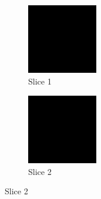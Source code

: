 \documentclass{article}
\begin{document}
\begin{figure}[t!] %
\begin{subfigure}{0.45\textwidth}
\includegraphics[width=\linewidth]{s_01.png}
\caption{Slice 1} \label{fig:a}
\end{subfigure}\hspace*{\fill}
\begin{subfigure}{0.45\textwidth}
\includegraphics[width=\linewidth]{s_02.png}
\caption{Slice 2} \label{fig:b}
\end{subfigure}


\end{figure}
\end{document}

